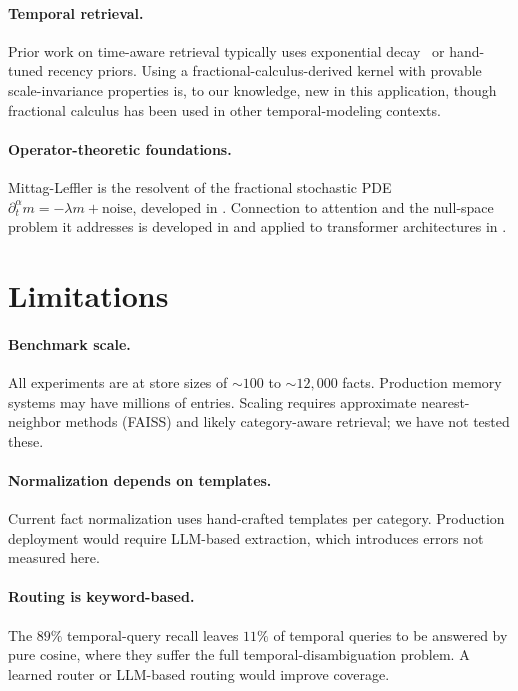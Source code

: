 \documentclass[11pt]{article}
\theoremstyle{plain}
\theoremstyle{definition}
\begin{document}
\paragraph{Temporal retrieval.}  Prior work on
time-aware retrieval typically uses exponential
decay~\cite{li2003time} or hand-tuned recency priors.
Using a fractional-calculus-derived kernel with
provable scale-invariance properties is, to our
knowledge, new in this application, though fractional
calculus has been used in other temporal-modeling
contexts.

\paragraph{Operator-theoretic foundations.}
Mittag-Leffler is the resolvent of the fractional
stochastic PDE
$\partial_t^\alpha m = -\lambda m + \mathrm{noise}$,
developed in \cite{fontes2026fracmem}.  Connection
to attention and the null-space problem it addresses
is developed in \cite{fontes2026opfac} and applied to
transformer architectures in \cite{fontes2026innov}.


\section{Limitations}\label{sec:limitations}

\paragraph{Benchmark scale.}  All experiments are at
store sizes of $\sim\!100$ to $\sim\!12{,}000$ facts.
Production memory systems may have millions of
entries.  Scaling requires approximate
nearest-neighbor methods (FAISS) and likely
category-aware retrieval; we have not tested these.

\paragraph{Normalization depends on templates.}
Current fact normalization uses hand-crafted templates
per category.  Production deployment would require
LLM-based extraction, which introduces errors not
measured here.

\paragraph{Routing is keyword-based.}  The $89\%$
temporal-query recall leaves $11\%$ of temporal
queries to be answered by pure cosine, where they
suffer the full temporal-disambiguation problem.  A
learned router or LLM-based routing would improve
coverage.
\end{document}
